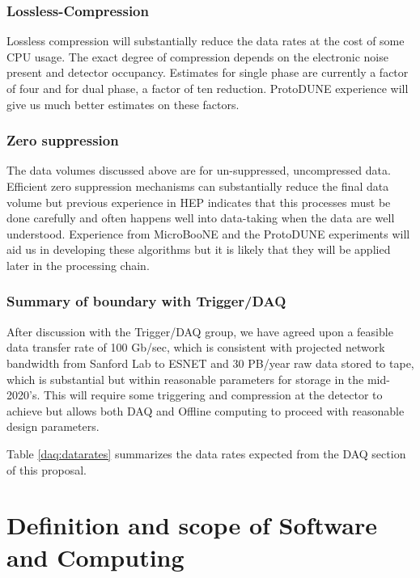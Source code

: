 \subsubsection{Lossless-Compression}

Lossless compression will substantially reduce the data rates at the cost of some CPU usage.  The exact degree of compression  depends on the electronic noise present and detector occupancy.  Estimates for single phase are currently a factor of four and for dual phase, a factor of ten reduction.  ProtoDUNE experience will give us much better estimates on these factors.


\subsubsection{Zero suppression}

The data volumes discussed above are for un-suppressed, uncompressed data.  Efficient zero suppression mechanisms can substantially reduce the final data volume but previous experience in HEP indicates that this processes must be done carefully and often happens well into data-taking when the data are well understood.  Experience from MicroBooNE and the ProtoDUNE experiments will aid us in developing these algorithms but it is likely that they will be applied later in the processing chain.  

\subsubsection{Summary of boundary with Trigger/DAQ}

After discussion with the Trigger/DAQ group, we have agreed upon a feasible data transfer rate of 100 Gb/sec, which is consistent with projected network bandwidth from Sanford Lab to ESNET and 30 PB/year raw data stored to tape, which is substantial but within reasonable parameters for storage in the mid-2020's.  This will require some triggering and compression at the detector to achieve but allows both DAQ and Offline computing to proceed with reasonable design parameters.

Table \ref{daq:datarates} summarizes the data rates expected from the DAQ section of this proposal. 






\section{Definition and scope of Software and Computing}

